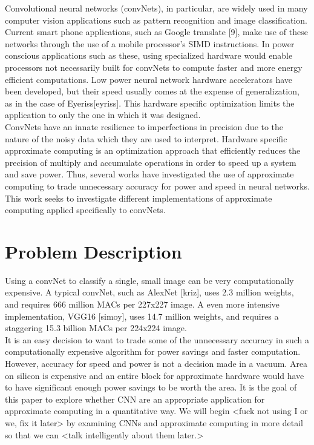\documentclass[journal]{IEEEtran}
\begin{document}
	\indent Convolutional neural networks (convNets), in particular, are widely used in many computer vision applications such as pattern recognition and image classification. Current smart phone applications, such as Google translate [9], make use of these networks through the use of a mobile processor's SIMD instructions. In power conscious applications such as these, using specialized hardware would enable processors not necessarily built for convNets to compute faster and more energy efficient computations. Low power neural network hardware accelerators have been developed, but their speed usually comes at the expense of generalization, as in the case of Eyeriss[eyriss]. This hardware specific optimization limits the application to only the one in which it was designed. \\	
	
	\indent ConvNets have an innate resilience to imperfections in precision due to the nature of the noisy data which they are used to interpret. Hardware specific approximate computing is an optimization approach that efficiently reduces the precision of multiply and accumulate operations in order to speed up a system and save power. Thus, several works have investigated the use of approximate computing to trade unnecessary accuracy for power and speed in neural networks. This work seeks to investigate different implementations of approximate computing applied specifically to convNets. 

\section{Problem Description}
	\indent Using a convNet to classify a single, small image can be very computationally expensive. A typical convNet, such as AlexNet [kriz], uses 2.3 million weights, and requires 666 million MACs per 227x227 image. A even more intensive implementation, VGG16 [simoy], uses 14.7 million weights, and requires a staggering 15.3 billion MACs per 224x224 image.\\
	
	\indent It is an easy decision to want to trade some of the unnecessary accuracy in such a computationally expensive algorithm for power savings and faster computation. However, accuracy for speed and power is not a decision made in a vacuum. Area on silicon is expensive and an entire block for approximate hardware would have to have significant enough power savings to be worth the area. It is the goal of this paper to explore whether CNN are an appropriate application for approximate computing in a quantitative way. We will begin <fuck not using I or we, fix it later> by examining CNNs and approximate computing in more detail so that we can <talk intelligently about them later.>
\end{document}
